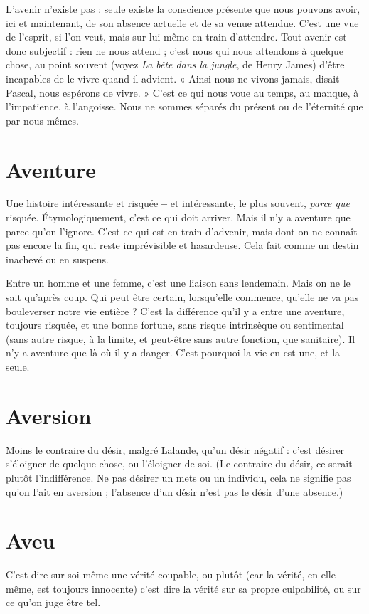 L'avenir n'existe pas : seule existe la conscience présente que nous pouvons
avoir, ici et maintenant, de son absence actuelle et de sa venue attendue. C’est
une vue de l’esprit, si l’on veut, mais sur lui-même en train d’attendre. Tout
avenir est donc subjectif : rien ne nous attend ; c’est nous qui nous attendons à
quelque chose, au point souvent (voyez {\it La bête dans la jungle}, de Henry James)
d’être incapables de le vivre quand il advient. « Ainsi nous ne vivons jamais,
disait Pascal, nous espérons de vivre. » C’est ce qui nous voue au temps, au
manque, à l’impatience, à l’angoisse. Nous ne sommes séparés du présent ou de
l'éternité que par nous-mêmes.

\section{Aventure}
Une histoire intéressante et risquée {\bf --} et intéressante, le plus
souvent, {\it parce que} risquée. Étymologiquement, c’est ce qui doit
arriver. Mais il n’y a aventure que parce qu’on l’ignore. C’est ce qui est en train
d’advenir, mais dont on ne connaît pas encore la fin, qui reste imprévisible et
hasardeuse. Cela fait comme un destin inachevé ou en suspens.

Entre un homme et une femme, c’est une liaison sans lendemain. Mais on
ne le sait qu'après coup. Qui peut être certain, lorsqu’elle commence, qu’elle ne
va pas bouleverser notre vie entière ? C’est la différence qu’il y a entre une aventure,
toujours risquée, et une bonne fortune, sans risque intrinsèque ou sentimental
(sans autre risque, à la limite, et peut-être sans autre fonction, que sanitaire).
Il n’y a aventure que là où il y a danger. C’est pourquoi la vie en est une,
et la seule.

\section{Aversion}
Moins le contraire du désir, malgré Lalande, qu’un désir négatif :
c’est désirer s'éloigner de quelque chose, ou l’éloigner de
soi. (Le contraire du désir, ce serait plutôt l'indifférence. Ne pas désirer un mets
ou un individu, cela ne signifie pas qu’on l’ait en aversion ; l'absence d’un désir
n’est pas le désir d’une absence.)

\section{Aveu}
C'est dire sur soi-même une vérité coupable, ou plutôt (car la vérité,
en elle-même, est toujours innocente) c’est dire la vérité sur sa propre
culpabilité, ou sur ce qu’on juge être tel.

